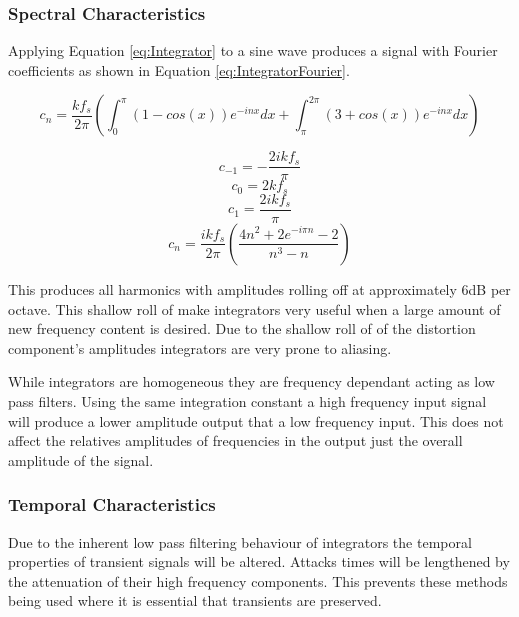 		\subsubsection*{Spectral Characteristics}
			Applying Equation \ref{eq:Integrator} to a sine wave produces a signal with Fourier coefficients as
			shown in Equation \ref{eq:IntegratorFourier}.

			\[ c_{n} = \frac{kf_{s}}{2\pi} \left( \int_{0}^{\pi} (1 - cos(x))e^{-inx} dx +
							       \int_{\pi}^{2\pi} (3 + cos(x))e^{-inx} dx \right) \]

			\[ c_{-1} = - \frac{2ikf_{s}}{\pi} \]
			\[ c_{0} = 2kf_{s} \]
			\[ c_{1} = \frac{2ikf_{s}}{\pi} \]
			\begin{equation}
				c_{n} = \frac{ikf_{s}}{2\pi} \left( \frac{4n^{2} + 2e^{-i\pi n} - 2}{n^{3} - n} \right)
				\label{eq:IntegratorFourier}
			\end{equation}

			This produces all harmonics with amplitudes rolling off at approximately 6dB per octave. This
			shallow roll of make integrators very useful when a large amount of new frequency content is
			desired. Due to the shallow roll of of the distortion component's amplitudes integrators are very
			prone to aliasing.

			While integrators are homogeneous they are frequency dependant acting as low pass filters. Using
			the same integration constant a high frequency input signal will produce a lower amplitude output
			that a low frequency input. This does not affect the relatives amplitudes of frequencies in the
			output just the overall amplitude of the signal.

		\subsubsection*{Temporal Characteristics}
			Due to the inherent low pass filtering behaviour of integrators the temporal properties of
			transient signals will be altered. Attacks times will be lengthened by the attenuation of their
			high frequency components. This prevents these methods being used where it is essential that
			transients are preserved. 
			


